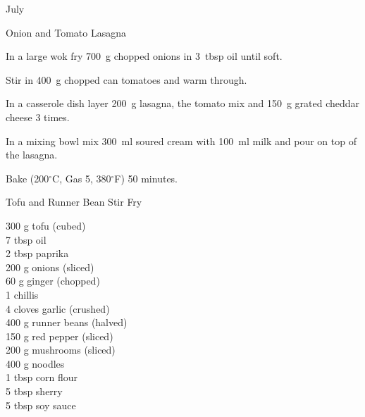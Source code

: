 \begin{menu}{July}
\begin{recipe}{2}{Onion and Tomato Lasagna}
\begin{ingredients}
		\end{ingredients}
	
	
	
    \begin{instructions}
    \item 
        In a large wok fry
        700~g chopped onions
        in
        3~tbsp  oil
        until soft.
      \item 
        Stir in 400~g chopped can tomatoes
        and warm through.
      \item 
        In a casserole dish layer
        200~g  lasagna,
        the tomato mix and
        150~g grated cheddar cheese
        3 times.
      \item 
        In a mixing bowl mix
        300~ml  soured cream
        with
        100~ml  milk
        and pour on top of the lasagna.
      \item 
        Bake (200$^{\circ}$C, Gas 5, 380$^{\circ}$F) 50 minutes.
      
    \end{instructions}
    \end{recipe}%
  
    \begin{recipe}{2}{Tofu and Runner Bean Stir Fry}%
		\begin{ingredients}
		300 g tofu (cubed) \\
	7 tbsp oil  \\
	2 tbsp paprika  \\
	200 g onions (sliced) \\
	60 g ginger (chopped) \\
	1  chillis  \\
	4 cloves garlic (crushed) \\
	400 g runner beans (halved) \\
	150 g red pepper (sliced) \\
	200 g mushrooms (sliced) \\
	400 g noodles  \\
	1 tbsp corn flour  \\
	5 tbsp sherry  \\
	5 tbsp soy sauce  \\
	
		\end{ingredients}
	
	

\end{recipe}
\end{menu}
